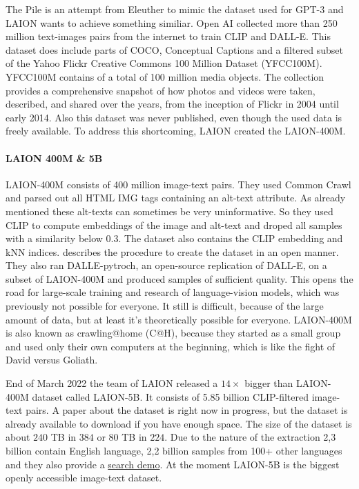 \documentclass[
]{krantz}
\begin{document}
The Pile is an attempt from Eleuther to mimic the dataset used for GPT-3 and LAION wants to achieve something similiar. Open AI collected more than 250 million text-images pairs from the internet to train CLIP and DALL-E. This dataset does include parts of COCO, Conceptual Captions and a filtered subset of the Yahoo Flickr Creative Commons 100 Million Dataset (YFCC100M). YFCC100M contains of a total of 100 million media objects. The collection provides a comprehensive snapshot of how photos and videos were taken, described, and shared over the years, from the inception of Flickr in 2004 until early 2014. Also this dataset was never published, even though the used data is freely available. To address this shortcoming, LAION created the LAION-400M.

\hypertarget{laion-400m-5b}{%
\paragraph{LAION 400M \& 5B}\label{laion-400m-5b}}

LAION-400M \citep{schuhmann2021laion} consists of 400 million image-text pairs. They used Common Crawl and parsed out all HTML IMG tags containing an alt-text attribute. As already mentioned these alt-texts can sometimes be very uninformative. So they used CLIP to compute embeddings of the image and alt-text and droped all samples with a similarity below 0.3. The dataset also contains the CLIP embedding and kNN indices. \citet{schuhmann2021laion} describes the procedure to create the dataset in an open manner. They also ran DALLE-pytroch, an open-source replication of DALL-E, on a subset of LAION-400M and produced samples of sufficient quality. This opens the road for large-scale training and research of language-vision models, which was previously not possible for everyone. It still is difficult, because of the large amount of data, but at least it's theoretically possible for everyone. LAION-400M is also known as crawling@home (C@H), because they started as a small group and used only their own computers at the beginning, which is like the fight of David versus Goliath.

End of March 2022 the team of LAION released a \(14 \times\) bigger than LAION-400M dataset called LAION-5B. It consists of 5.85 billion CLIP-filtered image-text pairs. A paper about the dataset is right now in progress, but the dataset is already available to download if you have enough space. The size of the dataset is about \(240\) TB in \(384\) or 80 TB in \(224\). Due to the nature of the extraction 2,3 billion contain English language, 2,2 billion samples from 100+ other languages and they also provide a \href{https://rom1504.github.io/clip-retrieval/?back=https\%3A\%2F\%2Fknn5.laion.ai\&index=laion5B\&useMclip=false}{search demo}. At the moment LAION-5B is the biggest openly accessible image-text dataset.
\end{document}
